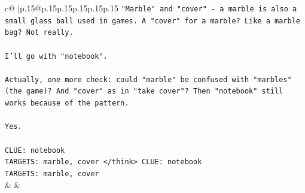 \documentclass{article}
\begin{document}
{\begin{supertabular}{c@{$\;$}|p{.15\linewidth}@{}p{.15\linewidth}p{.15\linewidth}p{.15\linewidth}p{.15\linewidth}p{.15\linewidth}}
{{{\texttt{"Marble" and "cover" {-} a marble is also a small glass ball used in games. A "cover" for a marble? Like a marble bag? Not really.} \\
\\ 
\texttt{I'll go with "notebook".} \\
\\ 
\texttt{Actually, one more check: could "marble" be confused with "marbles" (the game)? And "cover" as in "take cover"? Then "notebook" still works because of the pattern.} \\
\\ 
\texttt{Yes.} \\
\\ 
\texttt{CLUE: notebook} \\
\texttt{TARGETS: marble, cover </think> CLUE: notebook} \\
\texttt{TARGETS: marble, cover} \\
            }
        }
    }
    & & \\ \\


\end{supertabular}}
\end{document}

